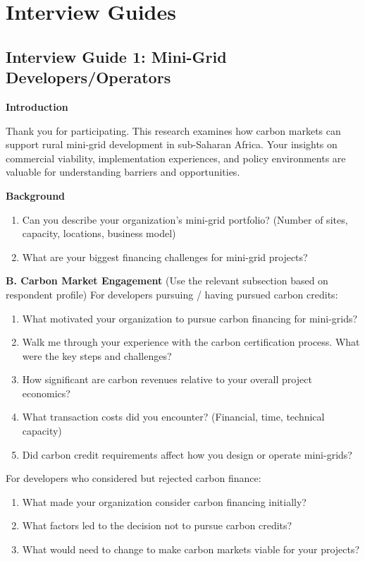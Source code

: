 \section{Interview Guides}
\label{app:interview-guides}

\subsection{Interview Guide 1: Mini-Grid Developers/Operators}
\textbf{Introduction}

Thank you for participating. This research examines how carbon markets can support rural mini-grid development in sub-Saharan Africa. Your insights on commercial viability, implementation experiences, and policy environments are valuable for understanding barriers and opportunities.

\textbf{Background}
\begin{enumerate}
	\item Can you describe your organization's mini-grid portfolio? (Number of sites, capacity, locations, business model)
	\item What are your biggest financing challenges for mini-grid projects?
\end{enumerate}

\textbf{B. Carbon Market Engagement}
(Use the relevant subsection based on respondent profile)
For developers pursuing / having pursued carbon credits:
\begin{enumerate}[resume]
	\item What motivated your organization to pursue carbon financing for mini-grids?
	\item Walk me through your experience with the carbon certification process. What were the key steps and challenges?
	\item How significant are carbon revenues relative to your overall project economics?
	\item What transaction costs did you encounter? (Financial, time, technical capacity)
	\item Did carbon credit requirements affect how you design or operate mini-grids?
\end{enumerate}

For developers who considered but rejected carbon finance:
\begin{enumerate}[start=3]
	\item What made your organization consider carbon financing initially?
	\item What factors led to the decision not to pursue carbon credits?
	\item What would need to change to make carbon markets viable for your projects?
\end{enumerate}

